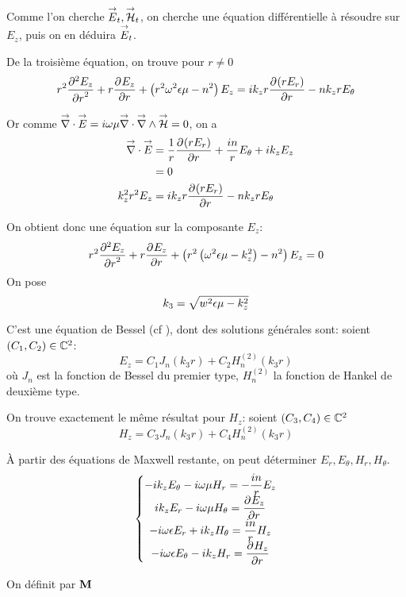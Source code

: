 Comme l'on cherche $\vE_t, \vH_t$, on cherche une équation différentielle à résoudre sur $E_z$, puis on en déduira $\vE_t$.

De la troisième  équation, on trouve pour $r\not=0$
\begin{equation}
r^2 \ddr[2]{r}{E_z} + r\ddr{r}{E_z} + \left(r^2\w^2\eps\mu - n^2\right)E_z =ik_zr\ddr{r}{(rE_r)} -  nk_zrE_\theta
\end{equation}


Or comme $\vdiv \vE = i\w\mu\vdiv\vrot\vH = 0$, on a
\begin{align}
    \vdiv\vE &= \frac{1}{r}\ddr{r}{(rE_r)} + \frac{in}{r}E_\theta + ik_zE_z
    \\
    &=0
    \\
    k_z^2r^2 E_z &= ik_zr\ddr{r}{(rE_r)} - nk_zrE_\theta
\end{align}

On obtient donc une équation sur la composante $E_z$:
\begin{equation}
    r^2 \ddr[2]{r}{E_z} + r\ddr{r}{E_z} + \left(r^2\left(\w^2\eps\mu - k_z^2\right) - n^2\right)E_z = 0
\end{equation}
On pose 
\begin{equation}
    k_3 = \sqrt{w^2\eps\mu - k_z^2}
\end{equation}

C'est une équation de Bessel (cf \cite[eq (6.80)]{bowman_introduction_1958}), dont des solutions générales sont: soient $(C_1,C_2) \in \CC^2$:
\begin{equation}
    E_z = C_1 J_n\left(k_3r\right) + C_2 H_n^{(2)}\left(k_3r\right)
\end{equation}
où $J_n$ est la fonction de Bessel du premier type, $H_n^{(2)}$ la fonction de Hankel de deuxième type. 

On trouve exactement le même résultat pour $H_z$: soient $(C_3,C_4) \in \CC^2$
\begin{equation}
    H_z = C_3 J_n\left(k_3r\right) + C_4 H_n^{(2)}\left(k_3r\right)
\end{equation}

À partir des équations de Maxwell restante, on peut déterminer $E_r,E_\theta,H_r,H_\theta$.
\begin{equation}
\left\lbrace
\begin{matrix}
    -ik_zE_\theta - i\w\mu H_r = -\frac{in}{r}E_z
    \\
    ik_zE_r - i\w\mu H_\theta = \ddr{r}{E_z}
    \\
    -i\w\eps E_r + ik_z H_\theta = \frac{in}{r}H_z
    \\
    -i\w\eps E_\theta - ik_z H_r = \ddr{r}{H_z}
\end{matrix}
\right.
\end{equation}

On définit par $\mat{M}$